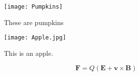 \documentclass{article}
\begin{document}
\begin{figure}[h]
\begin{center}
\texttt{[image: Pumpkins]} %
\caption{These are pumpkins}
 \label{fig:pumpkin}
\end{center}
\end{figure}

\begin{figure}[h]
\begin{center}
\texttt{[image: Apple.jpg]} %
\caption{This is an apple.}
 \label{fig:apple}
\end{center}
\end{figure}

$$\mathbf{F} = Q (\mathbf{E} + \mathbf{v} \times \mathbf{B})$$









\end{document}
